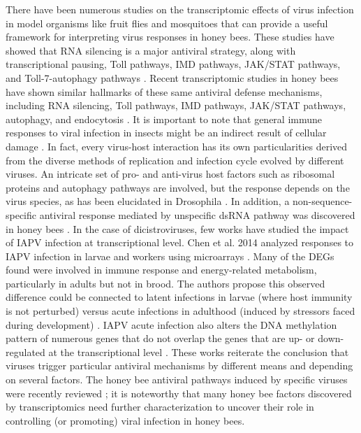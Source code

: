 \documentclass{bmcart}
\begin{document}
\begin{linenumbers}
\begin{doublespacing}
There have been numerous studies on the transcriptomic effects of virus infection in model organisms like fruit flies and mosquitoes that can provide a useful framework for interpreting virus responses in honey bees. These studies have showed that RNA silencing is a major antiviral strategy, along with transcriptional pausing, Toll pathways, IMD pathways, JAK/STAT pathways, and Toll-7-autophagy pathways \cite{cherryReview, swevers}. Recent transcriptomic studies in honey bees have shown similar hallmarks of these same antiviral defense mechanisms, including RNA silencing, Toll pathways, IMD pathways, JAK/STAT pathways, autophagy, and endocytosis \cite{McMenamin}. It is important to note that general immune responses to viral infection in insects might be an indirect result of cellular damage \cite{swevers}. In fact, every virus-host interaction has its own particularities derived from the diverse methods of replication and infection cycle evolved by different viruses. An intricate set of pro- and anti-virus host factors such as ribosomal proteins and autophagy pathways are involved, but the response depends on the virus species, as has been elucidated in Drosophila \cite{cherryReview, swevers}. In addition, a non-sequence-specific antiviral response mediated by unspecific dsRNA pathway was discovered in honey bees \cite{Flenniken, Brutscher}. In the case of dicistroviruses, few works have studied the impact of IAPV infection at transcriptional level. Chen et al. 2014 analyzed responses to IAPV infection in larvae and workers using microarrays \cite{Chen}. Many of the DEGs found were involved in immune response and energy-related metabolism, particularly in adults but not in brood. The authors propose this observed difference could be connected to latent infections in larvae (where host immunity is not perturbed) versus acute infections in adulthood (induced by stressors faced during development) \cite{Chen}. IAPV acute infection also alters the DNA methylation pattern of numerous genes that do not overlap the genes that are up- or down-regulated at the transcriptional level \cite{galbraith}. These works reiterate the conclusion that viruses trigger particular antiviral mechanisms by different means and depending on several factors. The honey bee antiviral pathways induced by specific viruses were recently reviewed \cite{McMenamin}; it is noteworthy that many honey bee factors discovered by transcriptomics need further characterization to uncover their role in controlling (or promoting) viral infection in honey bees.


\end{doublespacing}
\end{linenumbers}
\end{document}
